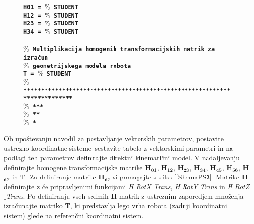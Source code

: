 \begin{figure}[h]
\textbf{\texttt{\hspace*{1cm}H01 = \textcolor[rgb]{0.13,0.55,0.13}{$\%$ STUDENT}}}\\ %
\textbf{\texttt{\hspace*{1cm}H12 = \textcolor[rgb]{0.13,0.55,0.13}{$\%$ STUDENT}}}\\ %
\textbf{\texttt{\hspace*{1cm}H23 = \textcolor[rgb]{0.13,0.55,0.13}{$\%$ STUDENT}}}\\ %
\textbf{\texttt{\hspace*{1cm}H34 = \textcolor[rgb]{0.13,0.55,0.13}{$\%$ STUDENT}}}\\ %
\\ %
\textcolor[rgb]{0.13,0.55,0.13}{\textbf{\texttt{$\%$ Multiplikacija homogenih transformacijskih matrik za izračun}}}\\ %
\textcolor[rgb]{0.13,0.55,0.13}{\textbf{\texttt{$\%$ geometrijskega modela robota}}}\\ %
\textbf{\texttt{\hspace*{1cm}T = \textcolor[rgb]{0.13,0.55,0.13}{$\%$ STUDENT}}}\\ %
\textcolor[rgb]{0.13,0.55,0.13}{\textbf{\texttt{$\%$ *************************************************************************}}}\\ %
\textcolor[rgb]{0.13,0.55,0.13}{\textbf{\texttt{$\%$ ***}}}\\ %
\textcolor[rgb]{0.13,0.55,0.13}{\textbf{\texttt{$\%$ **}}}\\ %
\textcolor[rgb]{0.13,0.55,0.13}{\textbf{\texttt{$\%$ *}}}\\ %

\end{figure}


\begin{mdframed}[backgroundcolor=green!20, shadow=false,roundcorner=12pt,topline
=false, rightline=false,bottomline=false,leftline=false]
        \vspace{0.2cm}
Ob upoštevanju navodil za postavljanje vektorskih parametrov,
postavite ustrezno koordinatne sisteme, sestavite tabelo z
vektorskimi parametri in na podlagi teh parametrov definirajte
direktni kinematični model. V nadaljevanju definirajte homogene
transformacijske matrike \textbf{H}$_\textbf{01}$,
\textbf{H}$_\textbf{12}$, \textbf{H}$_\textbf{23}$,
\textbf{H}$_\textbf{34}$, \textbf{H}$_\textbf{45}$,
\textbf{H}$_\textbf{56}$, \textbf{H}$_\textbf{67}$ in \textbf{T}. Za
definiranje matrike \textbf{H}$_\textbf{67}$ si pomagajte s sliko
\ref{fShemaPS3}.  Matrike \textbf{H} definirajte z če pripravljenimi
funkcijami \emph{H$\_$RotX$\_$Trans}, \emph{H$\_$RotY$\_$Trans} in
\emph{H$\_$RotZ$\_$Trans}. Po definiranju vseh sedmih \textbf{H}
matrik z ustreznim zaporedjem množenja izračunajte matriko
\textbf{T}, ki predstavlja lego vrha robota (zadnji koordinatni
sistem) glede na referenčni koordinatni sistem. \vspace{0.2cm}
\end{mdframed}

